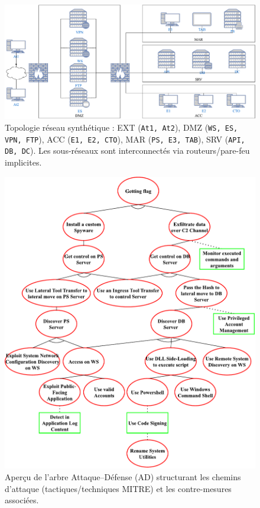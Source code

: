 \begin{figure}[h!]
  \centering
  \includegraphics[width=\linewidth]{figures/topology.pdf}
  \caption{Topologie réseau synthétique : EXT (\texttt{At1, At2}), DMZ (\texttt{WS, ES, VPN, FTP}), ACC (\texttt{E1, E2, CTO}), MAR (\texttt{PS, E3, TAB}), SRV (\texttt{API, DB, DC}). Les sous-réseaux sont interconnectés via routeurs/pare-feu implicites.}
  \label{fig:scenario_network_topology}
\end{figure}

\begin{figure}[h!]
  \centering
  \includegraphics[width=0.86\linewidth]{figures/ADTree.pdf}
  \caption{Aperçu de l’arbre Attaque–Défense (AD) structurant les chemins d’attaque (tactiques/techniques MITRE) et les contre-mesures associées.}
  \label{fig:ADTree}
\end{figure}


